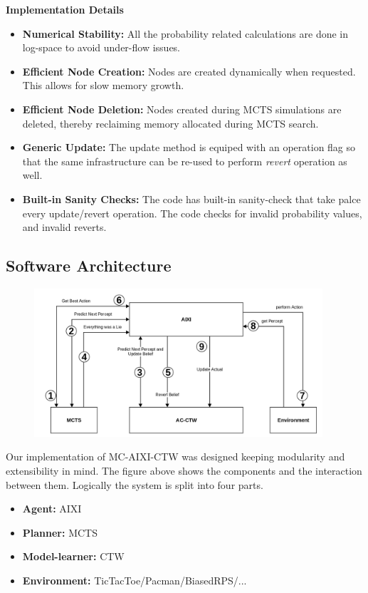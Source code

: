 \documentclass{article}
\theoremstyle{definition}
\newtheorem{primary statistics}[definition]{Primary Statistics}
\newtheorem{auxiliary statistics}[definition]{Auxiliary Statistics}
\begin{document}
\begin{itemize}
    \textbf{Implementation Details}
    \begin{itemize}
        \item \textbf{Numerical Stability:} All the probability related calculations are done in log-space to avoid under-flow issues.
        \item \textbf{Efficient Node Creation:} Nodes are created dynamically when requested. This allows for slow memory growth.
        \item \textbf{Efficient Node Deletion:} Nodes created during MCTS simulations are deleted, thereby reclaiming memory allocated during MCTS search.
        \item \textbf{Generic Update:} The update method is equiped with an operation flag so that the same infrastructure can be re-used to perform \textit{revert} operation as well.
        \item \textbf{Built-in Sanity Checks:} The code has built-in sanity-check that take palce every update/revert operation. The code checks for invalid probability values, and invalid reverts.
    \end{itemize}
\end{itemize}


\subsection{Software Architecture}

\begin{figure}[h]
    \centering
    \includegraphics[height=5.5cm]{soft_arch_crop}    
\end{figure}

Our implementation of MC-AIXI-CTW was designed keeping modularity and extensibility in mind. The figure above shows the components and the interaction between them. Logically the system is split into four parts. 
\begin{itemize}
    \item \textbf{Agent: } AIXI
    \item \textbf{Planner: } MCTS
    \item \textbf{Model-learner: } CTW
    \item \textbf{Environment: } TicTacToe/Pacman/BiasedRPS/...
\end{itemize}
\end{document}
